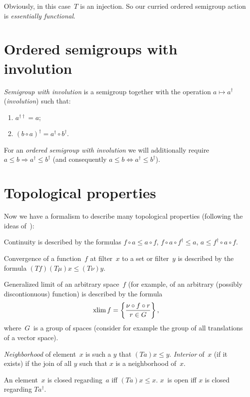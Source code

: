 Obviously, in this case~$T$ is an injection. So our curried ordered semigroup action is \emph{essentially functional}.

\section{Ordered semigroups with involution}

\begin{defn}
\emph{Semigroup with involution} is a semigroup together with the operation $a\mapsto a^{\dagger}$ (\emph{involution}) such that:
\begin{enumerate}
\item $a^{\dagger\dagger} = a$;
\item $(b\circ a)^{\dagger} = a^{\dagger}\circ b^{\dagger}$.
\end{enumerate}
\end{defn}

For an \emph{ordered semigroup with involution} we will additionally require $a\leq b\Rightarrow a^{\dagger}\leq b^{\dagger}$ (and consequently $a\leq b\Leftrightarrow a^{\dagger}\leq b^{\dagger}$).

\section{Topological properties}

Now we have a formalism to describe many topological properties (following the ideas of~\cite{volume-1}):

Continuity is described by the formulas $f\circ a\leq a\circ f$, $f\circ a\circ f^{\dagger}\leq a$, $a\leq f^{\dagger}\circ a\circ f$.

Convergence of a function~$f$ at filter~$x$ to a set or filter~$y$ is described by the formula $(Tf)(T\mu)x\leq(T\nu)y$.

Generalized limit of an arbitrary space~$f$ (for example, of an arbitrary (possibly discontionuous) function) is described by the formula \[ \operatorname{xlim} f=\left\{ \frac{\nu\circ f\circ r}{r\in G}\right\}, \]
where~$G$~is a group of spaces (consider for example the group of all translations of a vector space).

\emph{Neighborhood} of element~$x$ is such a $y$ that $(Ta)x\leq y$. \emph{Interior} of~$x$ (if it exists) if the join of all $y$ such that $x$ is a neighborhood of~$x$.

An element~$x$ is closed regarding~$a$ iff $(Ta)x\leq x$. $x$~is open iff $x$ is closed regarding $Ta^{\dagger}$.

